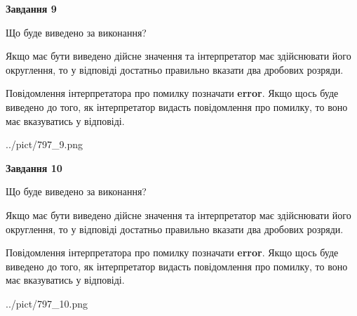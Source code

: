 \documentclass[12pt, ukrainian]{article}
\begin{document}
{\begin {Large}
{\begin {center}\textbf{Завдання 9}\end {center}}\par
Що буде виведено за виконання? \par

Якщо має бути виведено дійсне значення та інтерпретатор має здійснювати його округлення, 
то у відповіді достатньо правильно вказати два дробових розряди.

Повідомлення інтерпретатора про помилку позначати \textbf{error}.
Якщо щось буде виведено до того, як інтерпретатор видасть повідомлення про помилку, 
то воно має вказуватись у відповіді. \par

\begin{center}
	{../pict/797_9.png}
\end{center}
\newpage

{\begin {center}\textbf{Завдання 10}\end {center}}\par
Що буде виведено за виконання? \par

Якщо має бути виведено дійсне значення та інтерпретатор має здійснювати його округлення, 
то у відповіді достатньо правильно вказати два дробових розряди.

Повідомлення інтерпретатора про помилку позначати \textbf{error}.
Якщо щось буде виведено до того, як інтерпретатор видасть повідомлення про помилку, 
то воно має вказуватись у відповіді. \par

\begin{center}
	{../pict/797_10.png}
\end{center}
\newpage

\end {Large}}
\end{document}
